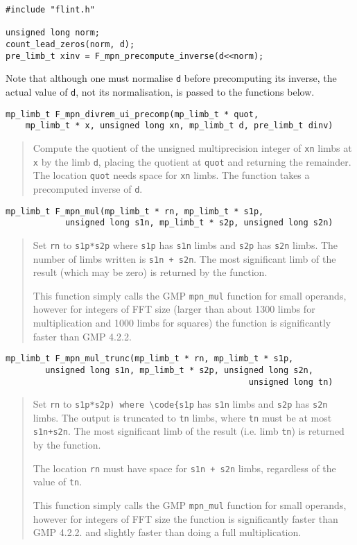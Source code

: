 \documentclass[a4paper,10pt]{article}
\newcommand{\code}{\lstinline}
\begin{document}
\begin{lstlisting}
#include "flint.h"

unsigned long norm;
count_lead_zeros(norm, d);
pre_limb_t xinv = F_mpn_precompute_inverse(d<<norm);
\end{lstlisting}

Note that although one must normalise \code{d} before precomputing its inverse, the actual value of \code{d}, not its normalisation, is passed to the functions below.

\begin{lstlisting}
mp_limb_t F_mpn_divrem_ui_precomp(mp_limb_t * quot, 
    mp_limb_t * x, unsigned long xn, mp_limb_t d, pre_limb_t dinv)
\end{lstlisting}
\begin{quote}
Compute the quotient of the unsigned multiprecision integer of \code{xn} limbs at \code{x} by the limb \code{d}, placing the quotient at \code{quot} and returning the remainder. The location \code{quot} needs space for \code{xn} limbs. The function takes a precomputed inverse of \code{d}.
\end{quote}
             
\begin{lstlisting}
mp_limb_t F_mpn_mul(mp_limb_t * rn, mp_limb_t * s1p, 
            unsigned long s1n, mp_limb_t * s2p, unsigned long s2n)
\end{lstlisting}
\begin{quote}
Set \code{rn} to \code{s1p*s2p} where \code{s1p} has \code{s1n} limbs and \code{s2p} has \code{s2n} limbs. The number of limbs written is \code{s1n + s2n}. The most significant limb of the result (which may be zero) is returned by the function.

This function simply calls the GMP \code{mpn_mul} function for small operands, however for integers of FFT size (larger than about 1300 limbs for multiplication and 1000 limbs for squares) the function is significantly faster than GMP 4.2.2.
\end{quote}
                                      
\begin{lstlisting}
mp_limb_t F_mpn_mul_trunc(mp_limb_t * rn, mp_limb_t * s1p, 
        unsigned long s1n, mp_limb_t * s2p, unsigned long s2n, 
                                                 unsigned long tn)
\end{lstlisting}
\begin{quote}
Set \code{rn} to \code{s1p*s2p) where \code{s1p} has \code{s1n} limbs and \code{s2p} has \code{s2n} limbs. The output is truncated to \code{tn} limbs, where \code{tn} must be at most \code{s1n+s2n}. The most significant limb of the result (i.e. limb \code{tn}) is returned by the function.

The location \code{rn} must have space for \code{s1n + s2n} limbs, regardless of the value of \code{tn}.

This function simply calls the GMP \code{mpn_mul} function for small operands, however for integers of FFT size the function is significantly faster than GMP 4.2.2. and slightly faster than doing a full multiplication.
\end{quote}
\end{document}
